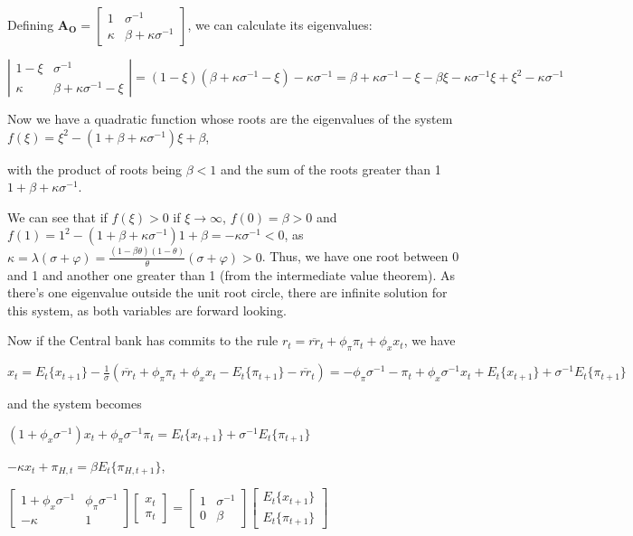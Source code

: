 \documentclass[
]{article}
\begin{document}
Defining
\(\mathbf{A_O}=\left[ \begin{matrix} 1 & \sigma^{-1} \\ \kappa & \beta +\kappa \sigma^{-1} \end{matrix} \right]\),
we can calculate its eigenvalues:

\(\left| \begin{matrix} 1-\xi & \sigma^{-1} \\ \kappa & \beta +\kappa \sigma^{-1}-\xi \end{matrix} \right|=(1-\xi)(\beta +\kappa \sigma^{-1}-\xi)-\kappa \sigma^{-1}= \beta +\kappa \sigma^{-1}-\xi - \beta \xi -\kappa \sigma^{-1} \xi+\xi^2 -\kappa \sigma^{-1}\)

Now we have a quadratic function whose roots are the eigenvalues of the
system \(f(\xi)=\xi^2-(1+\beta+\kappa \sigma^{-1})\xi+\beta\),

with the product of roots being \(\beta<1\) and the sum of the roots
greater than 1 \(1+\beta+\kappa \sigma^{-1}\).

We can see that if \(f(\xi)>0\) if \(\xi \rightarrow \infty\),
\(f(0)=\beta>0\) and
\(f(1)=1^2-(1+\beta+\kappa \sigma^{-1})1+\beta=-\kappa \sigma^{-1}<0\),
as
\(\displaystyle \kappa=\lambda(\sigma+\varphi)=\frac{(1-\beta \theta)(1-\theta)}{\theta}(\sigma+\varphi)>0\).
Thus, we have one root between 0 and 1 and another one greater than 1
(from the intermediate value theorem). As there's one eigenvalue outside
the unit root circle, there are infinite solution for this system, as
both variables are forward looking.

Now if the Central bank has commits to the rule
\(r_t=\overline{rr}_t+\phi_\pi \pi_t+\phi_x x_t\), we have

\(\displaystyle x_t = E_t\{x_{t+1}\} -\frac{1}{\sigma}(\overline{rr}_t+\phi_\pi \pi_{t}+\phi_x x_t-E_t\{\pi_{t+1}\} -\overline{rr}_t)= -\phi_\pi \sigma^{-1} -\pi_{t}+\phi_x \sigma^{-1} x_t + E_t\{x_{t+1}\}+ \sigma^{-1}E_t\{\pi_{t+1}\}\)

and the system becomes

\(\displaystyle (1+\phi_x \sigma^{-1})x_t +\phi_\pi \sigma^{-1}\pi_{t} = E_t\{x_{t+1}\} +\sigma^{-1}E_t\{\pi_{t+1}\}\)

\(-\kappa x_t +\pi_{H,t}=\beta E_t\{ \pi_{H,t+1}\}\),

\(\displaystyle \left[ \begin{matrix} 1+\phi_x \sigma^{-1} & \phi_\pi \sigma^{-1}\\ -\kappa & 1 \end{matrix} \right] \left[ \begin{matrix} x_t\\ \pi_t \end{matrix} \right] = \left[ \begin{matrix} 1 & \sigma^{-1} \\ 0 & \beta \end{matrix} \right] \left[ \begin{matrix} E_t\{x_{t+1} \}\\ E_t \{\pi_{t+1} \} \end{matrix} \right]\)
\end{document}
